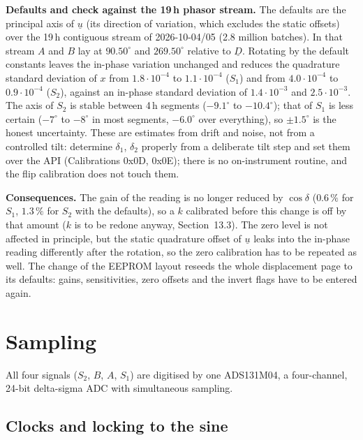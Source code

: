 \documentclass[11pt,a4paper]{article}
\begin{document}
\textbf{Defaults and check against the 19\,h phasor stream.}  The defaults
are the principal axis of $\underline{u}$ (its direction of variation, which
excludes the static offsets) over the 19\,h contiguous stream of 2026-10-04/05
(2.8 million batches).  In that stream $A$ and $B$ lay at $90.50^{\circ}$ and
$269.50^{\circ}$ relative to $\underline{D}$.  Rotating by the default
constants leaves the in-phase variation unchanged and reduces the quadrature
standard deviation of $x$ from $1.8\cdot10^{-4}$ to $1.1\cdot10^{-4}$ ($S_1$)
and from $4.0\cdot10^{-4}$ to $0.9\cdot10^{-4}$ ($S_2$), against an in-phase
standard deviation of $1.4\cdot10^{-3}$ and $2.5\cdot10^{-3}$.  The axis of
$S_2$ is stable between 4\,h segments ($-9.1^{\circ}$ to $-10.4^{\circ}$); that
of $S_1$ is less certain ($-7^{\circ}$ to $-8^{\circ}$ in most segments,
$-6.0^{\circ}$ over everything), so $\pm1.5^{\circ}$ is the honest
uncertainty.  These are estimates from drift and noise, not from a controlled
tilt: determine $\delta_1$, $\delta_2$ properly from a deliberate tilt step and set
them over the API (Calibrations 0x0D, 0x0E); there is no on-instrument routine, and
the flip calibration does not touch them.

\textbf{Consequences.}  The gain of the reading is no longer reduced by
$\cos\delta$ ($0.6\,\%$ for $S_1$, $1.3\,\%$ for $S_2$ with the defaults), so a
$k$ calibrated before this change is off by that amount ($k$ is to be
redone anyway, Section~13.3).  The zero level is not
affected in principle, but the static quadrature offset of $\underline{u}$
leaks into the in-phase reading differently after the rotation, so the zero
calibration has to be repeated as well.  The change of the EEPROM layout
reseeds the whole displacement page to its defaults: gains, sensitivities,
zero offsets and the invert flags have to be entered again.


\section{Sampling}

All four signals ($S_2$, $B$, $A$, $S_1$) are digitised by one
ADS131M04, a four-channel, 24-bit delta-sigma ADC with simultaneous
sampling.

\subsection{Clocks and locking to the sine}
\end{document}
